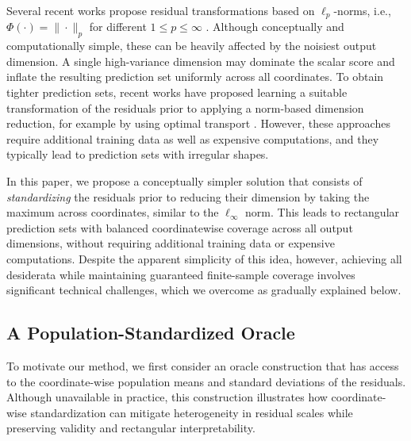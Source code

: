{\color{brown}Several recent works propose residual transformations based on $\ell_p$-norms, i.e., $\Phi(\cdot) = \|\cdot\|_p$ for different $1\leq p \leq \infty$ \citep{johnstone2022exact}. Although conceptually and computationally simple, these can be heavily affected by the noisiest output dimension. A single high-variance dimension may dominate the scalar score and inflate the resulting prediction set uniformly across all coordinates. 
To obtain tighter prediction sets, recent works have proposed learning a suitable transformation of the residuals prior to applying a norm-based dimension reduction, for example by using optimal transport \citep{thurin2025otcp, klein2025multivariate}.
However, these approaches require additional training data as well as expensive computations, and they typically lead to prediction sets with irregular shapes.}

In this paper, we propose a conceptually simpler solution that consists of {\em standardizing} the residuals prior to reducing their dimension by taking the maximum across coordinates, similar to the $\ell_\infty$ norm. This leads to rectangular prediction sets with balanced coordinatewise coverage across all output dimensions, without requiring additional training data or expensive computations.
Despite the apparent simplicity of this idea, however, achieving all desiderata while maintaining guaranteed finite-sample coverage involves significant technical challenges, which we overcome as gradually explained below.


\subsection{A Population-Standardized Oracle}
\label{sec:pop-oracle}
 
To motivate our method, we first consider an oracle construction that has access to the coordinate-wise population means and standard deviations of the residuals. 
Although unavailable in practice, this
construction illustrates how coordinate-wise standardization can mitigate heterogeneity in residual scales while preserving validity and rectangular interpretability.

